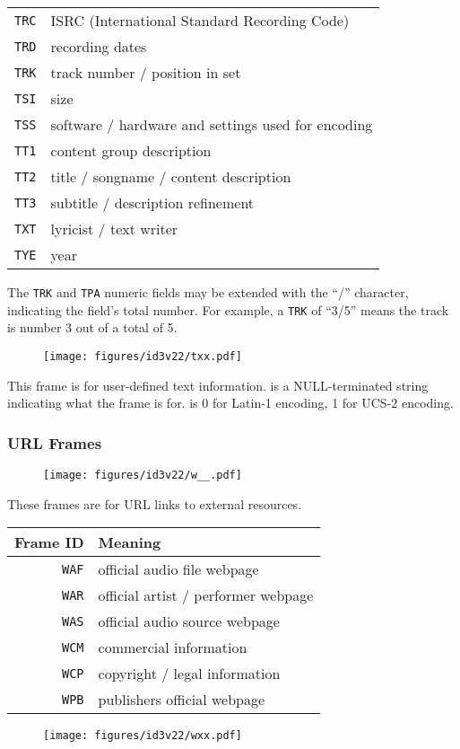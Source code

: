 \begin{table}[h]
{\begin{tabular}{|r|l|}
\texttt{TRC} & ISRC (International Standard Recording Code) \\
\texttt{TRD} & recording dates \\
\texttt{TRK} & track number / position in set \\
\texttt{TSI} & size \\
\texttt{TSS} & software / hardware and settings used for encoding \\
\texttt{TT1} & content group description \\
\texttt{TT2} & title / songname / content description \\
\texttt{TT3} & subtitle / description refinement \\
\texttt{TXT} & lyricist / text writer \\
\texttt{TYE} & year \\
\hline
\end{tabular}
}
\end{table}
\par
The \texttt{TRK} and \texttt{TPA} numeric fields may be extended
with the ``/'' character, indicating the field's total number.
For example, a \texttt{TRK} of ``3/5'' means the track is number
3 out of a total of 5.

\begin{figure}[h]
\texttt{[image: figures/id3v22/txx.pdf]}
\end{figure}
This frame is for user-defined text information.
 is a NULL-terminated string indicating
what the frame is for.
 is 0 for Latin-1 encoding, 1 for UCS-2 encoding.

\subsubsection{URL Frames}

\begin{figure}[h]
\texttt{[image: figures/id3v22/w\_\_.pdf]}
\end{figure}
These frames are for URL links to external resources.
\par
\begin{table}[h]
\begin{tabular}{|r|l|}
\hline
Frame ID & Meaning \\
\hline
\texttt{WAF} & official audio file webpage \\
\texttt{WAR} & official artist / performer webpage \\
\texttt{WAS} & official audio source webpage \\
\texttt{WCM} & commercial information \\
\texttt{WCP} & copyright / legal information \\
\texttt{WPB} & publishers official webpage \\
\hline
\end{tabular}
\end{table}
\begin{figure}[h]
\texttt{[image: figures/id3v22/wxx.pdf]}
\end{figure}

